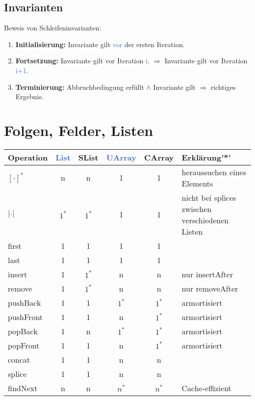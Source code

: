 \documentclass[11pt]{article}
\def \texcol{RoyalBlue}
\begin{document}
\subsection{Invarianten}

Beweis von Schleifeninvarianten:
\begin{enumerate}
\item \textbf{Initialisierung:} Invariante gilt \textcolor{\texcol}{vor} der ersten Iteration.
\item \textbf{Fortsetzung:} Invariante gilt vor Iteration \textcolor{\texcol}{i}. $\Rightarrow$ Invariante gilt vor Iteration \textcolor{\texcol}{i+1}.
\item \textbf{Terminierung:} Abbruchbedingung erfüllt $\land$ Invariante gilt $\Rightarrow$ richtiges Ergebnis.
\end{enumerate}

\section{Folgen, Felder, Listen}

\begin{center}
	\begin{tabular}{|l|cccc|l|}
	Operation & \textcolor{\texcol}{List}\index{Liste} & SList & \textcolor{\texcol}	{UArray}\index{Unbound Array} & CArray\index{Cyclic Array} & Erklärung'*'\\
	\hline
	$[\cdot]^*$ & n 	& n 	& 1 	& 1 	& heraussuchen eines Elements\\
	$|\cdot |$ 	& $1^*$ & $1^*$ & 1 	& 1 	& nicht bei splices zwischen verschiedenen Listen\\
	first 		& 1 	& 1		& 1 	& 1 	& \\
	last 		& 1 	& 1 	& 1 	& 1 	& \\
	insert 		& 1 	& $1^*$ & n 	& n 	& nur insertAfter\\
	remove 		& 1 	& $1^*$	& n 	& n 	& nur removeAfter\\
	pushBack 	& 1 	& 1 	& $1^*$ & $1^*$ & armortisiert\\
	pushFront 	& 1 	& 1 	& n 	& $1^*$ & armortisiert\\
	popBack		& 1 	& n 	& $1^*$	& $1^*$ & armortisiert\\
	popFront 	& 1 	& 1 	& n 	& $1^*$ & armortisiert\\
	concat		& 1 	& 1 	& n 	& n 	& \\
	splice		& 1 	& 1 	& n 	& n 	& \\
	findNext	& n 	& n 	& $n^*$	& $n^*$ & Cache-effizient\\
	\end{tabular}
\end{center}
\end{document}
